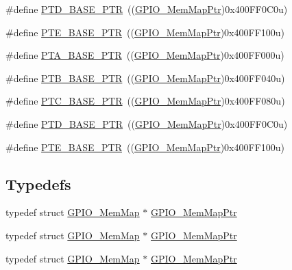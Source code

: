 \begin{DoxyCompactItemize}
\item 
\#define \hyperlink{group___g_p_i_o___peripheral_gaa61d2c33375f3becbae1353eee4c1317}{P\+T\+D\+\_\+\+B\+A\+S\+E\+\_\+\+P\+TR}~((\hyperlink{group___g_p_i_o___peripheral_ga31c1eddda45aa085f51142987e05ada5}{G\+P\+I\+O\+\_\+\+Mem\+Map\+Ptr})0x400\+F\+F0\+C0u)
\item 
\#define \hyperlink{group___g_p_i_o___peripheral_gaa230685f72ad1540850ab8d12366775c}{P\+T\+E\+\_\+\+B\+A\+S\+E\+\_\+\+P\+TR}~((\hyperlink{group___g_p_i_o___peripheral_ga31c1eddda45aa085f51142987e05ada5}{G\+P\+I\+O\+\_\+\+Mem\+Map\+Ptr})0x400\+F\+F100u)
\item 
\#define \hyperlink{group___g_p_i_o___peripheral_gadf98f6ee2bbfd42102e378a66b29b9ef}{P\+T\+A\+\_\+\+B\+A\+S\+E\+\_\+\+P\+TR}~((\hyperlink{group___g_p_i_o___peripheral_ga31c1eddda45aa085f51142987e05ada5}{G\+P\+I\+O\+\_\+\+Mem\+Map\+Ptr})0x400\+F\+F000u)
\item 
\#define \hyperlink{group___g_p_i_o___peripheral_ga59ab0f28e891ea28f152505ce2021747}{P\+T\+B\+\_\+\+B\+A\+S\+E\+\_\+\+P\+TR}~((\hyperlink{group___g_p_i_o___peripheral_ga31c1eddda45aa085f51142987e05ada5}{G\+P\+I\+O\+\_\+\+Mem\+Map\+Ptr})0x400\+F\+F040u)
\item 
\#define \hyperlink{group___g_p_i_o___peripheral_gaaa3dc05c2a51a960067e1de6863fd3dd}{P\+T\+C\+\_\+\+B\+A\+S\+E\+\_\+\+P\+TR}~((\hyperlink{group___g_p_i_o___peripheral_ga31c1eddda45aa085f51142987e05ada5}{G\+P\+I\+O\+\_\+\+Mem\+Map\+Ptr})0x400\+F\+F080u)
\item 
\#define \hyperlink{group___g_p_i_o___peripheral_gaa61d2c33375f3becbae1353eee4c1317}{P\+T\+D\+\_\+\+B\+A\+S\+E\+\_\+\+P\+TR}~((\hyperlink{group___g_p_i_o___peripheral_ga31c1eddda45aa085f51142987e05ada5}{G\+P\+I\+O\+\_\+\+Mem\+Map\+Ptr})0x400\+F\+F0\+C0u)
\item 
\#define \hyperlink{group___g_p_i_o___peripheral_gaa230685f72ad1540850ab8d12366775c}{P\+T\+E\+\_\+\+B\+A\+S\+E\+\_\+\+P\+TR}~((\hyperlink{group___g_p_i_o___peripheral_ga31c1eddda45aa085f51142987e05ada5}{G\+P\+I\+O\+\_\+\+Mem\+Map\+Ptr})0x400\+F\+F100u)
\end{DoxyCompactItemize}
\subsection*{Typedefs}
\begin{DoxyCompactItemize}
\item 
typedef struct \hyperlink{struct_g_p_i_o___mem_map}{G\+P\+I\+O\+\_\+\+Mem\+Map} $\ast$ \hyperlink{group___g_p_i_o___peripheral_ga31c1eddda45aa085f51142987e05ada5}{G\+P\+I\+O\+\_\+\+Mem\+Map\+Ptr}
\item 
typedef struct \hyperlink{struct_g_p_i_o___mem_map}{G\+P\+I\+O\+\_\+\+Mem\+Map} $\ast$ \hyperlink{group___g_p_i_o___peripheral_ga31c1eddda45aa085f51142987e05ada5}{G\+P\+I\+O\+\_\+\+Mem\+Map\+Ptr}
\item 
typedef struct \hyperlink{struct_g_p_i_o___mem_map}{G\+P\+I\+O\+\_\+\+Mem\+Map} $\ast$ \hyperlink{group___g_p_i_o___peripheral_ga31c1eddda45aa085f51142987e05ada5}{G\+P\+I\+O\+\_\+\+Mem\+Map\+Ptr}
\end{DoxyCompactItemize}


